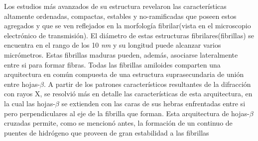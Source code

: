 Los estudios más avanzados de su estructura revelaron las características altamente ordenadas, compactas, estables y no-ramificadas que poseen estos agregados y que se ven reflejados en
la morfología fibrilar(vista en el microscopio electrónico de transmisión).
El diámetro de estas estructuras fibrilares(fibrillas) se encuentra en el rango de los 10 \textit{nm} y su longitud puede alcanzar varios micrómetros. 
Estas fibrillas maduras pueden, además, asociarse lateralmente entre si para formar fibras.
Todas las fibrillas amiloides comparten una arquitectura en común compuesta de una estructura suprasecundaria de unión entre hojas-$\beta$.
A partir de los patrones característicos resultantes de la difracción con rayos X, se resolvió más en detalle las características de esta arquitectura, en la cual 
las hojas-$\beta$ se extienden con las caras de sus hebras enfrentadas entre si pero perpendiculares al eje de la fibrilla que forman\cite{nelson2005structure}.  
Esta arquitectura de hojas-$\beta$ cruzadas permite, como se mencionó antes, la formación de un continuo de puentes de hidrógeno que proveen de gran estabilidad a las fibrillas 

